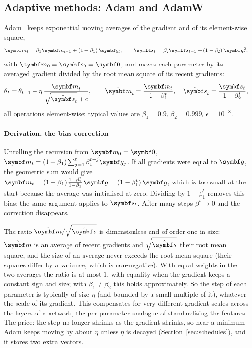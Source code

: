 \documentclass[11pt]{article}
\newcommand{\gvec}{\vect{g}}
\newcommand{\mvec}{\vect{m}}
\begin{document}
\subsection{Adaptive methods: Adam and AdamW}\label{sec:adam}

Adam~\cite{kingma2015} keeps exponential moving averages of the gradient and of its element-wise square,
\[
  \mvec_t = \beta_1\mvec_{t-1} + (1 - \beta_1)\,\gvec_t, \qquad
  \vect{s}_t = \beta_2\vect{s}_{t-1} + (1 - \beta_2)\,\gvec_t^2 ,
\]
with $\mvec_0 = \vect{s}_0 = \vect{0}$, and moves each parameter by its averaged gradient divided by the root mean
square of its recent gradients:
\[
  \theta_{t} = \theta_{t-1} - \eta\,\frac{\hat{\mvec}_t}{\sqrt{\hat{\vect{s}}_t} + \epsilon}, \qquad
  \hat{\mvec}_t = \frac{\mvec_t}{1 - \beta_1^t}, \quad \hat{\vect{s}}_t = \frac{\vect{s}_t}{1 - \beta_2^t},
\]
all operations element-wise; typical values are $\beta_1 = 0.9$, $\beta_2 = 0.999$, $\epsilon = 10^{-8}$.

\paragraph{Derivation: the bias correction} Unrolling the recursion from $\mvec_0 = \vect{0}$,
$\mvec_t = (1 - \beta_1)\sum_{j=1}^{t}\beta_1^{t-j}\gvec_j$. If all gradients were equal to $\gvec$, the geometric sum
would give $\mvec_t = (1 - \beta_1)\,\frac{1 - \beta_1^t}{1 - \beta_1}\,\gvec = (1 - \beta_1^t)\,\gvec$, which is too small at
the start because the average was initialised at zero. Dividing by $1 - \beta_1^t$ removes this bias; the same
argument applies to $\vect{s}_t$. After many steps $\beta^t \to 0$ and the correction disappears.

The ratio $\hat{\mvec}/\sqrt{\hat{\vect{s}}}$ is dimensionless and of order one in size: $\hat{\mvec}$ is an average of
recent gradients and $\sqrt{\hat{\vect{s}}}$ their root mean square, and the size of an average never exceeds the root
mean square (their squares differ by a variance, which is non-negative). With equal weights in the two averages the
ratio is at most $1$, with equality when the gradient keeps a constant sign and size; with $\beta_1 \ne \beta_2$ this
holds approximately. So the step of each parameter is typically of size $\eta$ (and bounded by a small multiple of
it), whatever the scale of its gradient. This compensates for very different gradient scales across the layers of a
network, the per-parameter analogue of standardising the features. The price: the step no longer shrinks as the
gradient shrinks, so near a minimum Adam keeps moving by about $\eta$ unless $\eta$ is decayed
(Section~\ref{sec:schedules}), and it stores two extra vectors.
\end{document}
